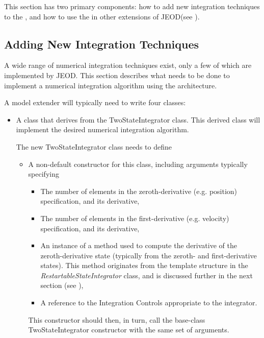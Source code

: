 This section has two primary components:  how to add new integration 
techniques to the \ModelDesc, and how to use the \ModelDesc in other 
extensions of JEOD(see ).

\subsection{Adding New Integration Techniques}\label{sec:user_modeldev_1}
A wide range of numerical integration techniques exist,
only a few of which are implemented by JEOD. This section
describes what needs to be done to implement a numerical integration
algorithm using the \ModelDesc architecture.

A model extender will typically need to write four classes:
\begin{itemize}
\item A class that derives from the TwoStateIntegrator class.
This derived class will implement the desired numerical integration algorithm.

The new TwoStateIntegrator class needs to define
\begin{itemize}
\item A non-default constructor for this class, including arguments typically 
specifying
\begin{itemize}
 \item The number of elements in the zeroth-derivative (e.g. position) 
 specification, and its derivative,
 \item The number of elements in the first-derivative (e.g. velocity) 
 specification, and its derivative,
 \item An instance of a method used to compute the derivative of the 
 zeroth-derivative state (typically from the zeroth- and first-derivative 
 states).  This method originates from the template structure in the 
 \textit{RestartableStateIntegrator} class, and is discussed further in the 
 next section (see ),
 \item A reference to the Integration Controls appropriate to the integrator.
\end{itemize}
This constructor should then, in turn, call the base-class TwoStateIntegrator 
constructor with the same set of arguments.


\end{itemize}
\end{itemize}
